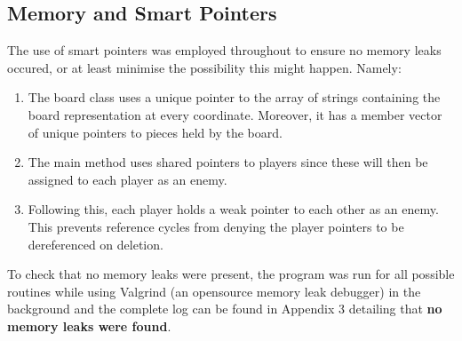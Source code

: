 \documentclass[11pt]{article} %
\begin{document}
\subsection{Memory and Smart Pointers}
The use of smart pointers was employed throughout to ensure no memory leaks occured, or at least minimise the possibility
this might happen.
Namely:
\begin{enumerate}[label=\roman*.]
  \item The board class uses a unique pointer to the array of strings containing the board representation at every
  coordinate. Moreover, it has a member vector of unique pointers to pieces held by the board.
  \item The main method uses shared pointers to players since these will then be assigned to each player as an enemy.
  \item Following this, each player holds a weak pointer to each other as an enemy.
   This prevents reference cycles from denying the player pointers to be dereferenced on deletion.
\end{enumerate}
To check that no memory leaks were present, the program was run for all possible
routines while using Valgrind (an opensource memory leak debugger) in the background
and the complete log can be found in Appendix 3 detailing that
\textbf{no memory leaks were found}.
\end{document}
